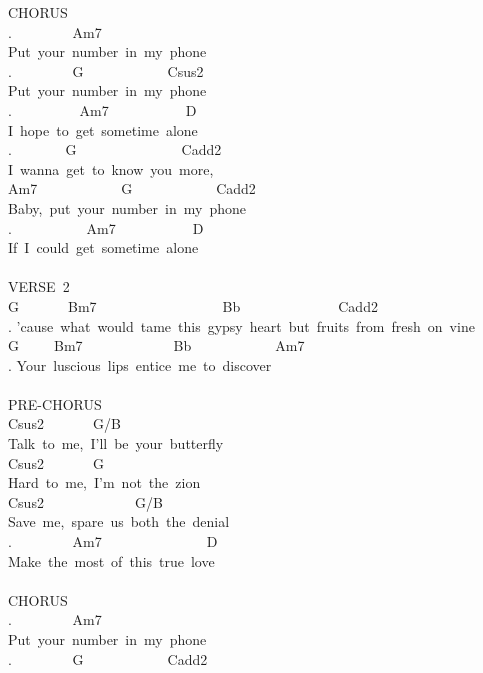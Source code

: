 {CHORUS\\
. \ \ \ \ \ \ \ \ Am7\\
Put\ your\ number\ in\ my\ phone\\
. \ \ \ \ \ \ \ \ G\ \ \ \ \ \ \ \ \ \ \ \ Csus2\\
Put\ your\ number\ in\ my\ phone\\
. \ \ \ \ \ \ \ \ \ Am7\ \ \ \ \ \ \ \ \ \ \ D\\
I\ hope\ to\ get\ sometime\ alone\\
. \ \ \ \ \ \ \ G\ \ \ \ \ \ \ \ \ \ \ \ \ \ \ Cadd2\\
I\ wanna\ get\ to\ know\ you\ more,\ \\
Am7\ \ \ \ \ \ \ \ \ \ \ \ G\ \ \ \ \ \ \ \ \ \ \ \ Cadd2\\
Baby,\ put\ your\ number\ in\ my\ phone\\
. \ \ \ \ \ \ \ \ \ \ Am7\ \ \ \ \ \ \ \ \ \ \ D\\
If\ I\ could\ get\ sometime\ alone\\
\\
VERSE\ 2\\
G\ \ \ \ \ \ \ Bm7\ \ \ \ \ \ \ \ \ \ \ \ \ \ \ \ \ \ Bb\ \ \ \ \ \ \ \ \ \ \ \ \ \ Cadd2\\
. 'cause\ what\ would\ tame\ this\ gypsy\ heart\ but\ fruits\ from\ fresh\ on\ vine\\
G\ \ \ \ \ Bm7\ \ \ \ \ \ \ \ \ \ \ \ \ Bb\ \ \ \ \ \ \ \ \ \ \ \ Am7\\
. Your\ luscious\ lips\ entice\ me\ to\ discover\\
\\
PRE-CHORUS\\
Csus2\ \ \ \ \ \ \ G/B\\
Talk\ to\ me,\ I'll\ be\ your\ butterfly\\
Csus2\ \ \ \ \ \ \ G\\
Hard\ to\ me,\ I'm\ not\ the\ zion\\
Csus2\ \ \ \ \ \ \ \ \ \ \ \ \ G/B\\
Save\ me,\ spare\ us\ both\ the\ denial\\
. \ \ \ \ \ \ \ \ Am7\ \ \ \ \ \ \ \ \ \ \ \ \ \ \ D\\
Make\ the\ most\ of\ this\ true\ love\\
\\
CHORUS\\
. \ \ \ \ \ \ \ \ Am7\\
Put\ your\ number\ in\ my\ phone\\
. \ \ \ \ \ \ \ \ G\ \ \ \ \ \ \ \ \ \ \ \ Cadd2\\
}
